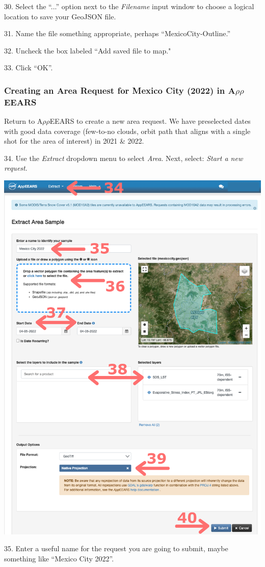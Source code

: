 \documentclass[oneside,a4paper,11pt,explicit]{book}
\begin{document}
30. Select the ``...'' option next to the \textit{Filename} input window to choose a logical location to save your GeoJSON file.

31. Name the file something appropriate, perhaps ``MexicoCity-Outline.'' 

32. Uncheck the box labeled ``Add saved file to map." 

33. Click ``OK''.

\subsubsection{Creating an Area Request for Mexico City (2022) in A$\rho\rho$EEARS}

Return to A$\rho\rho$EEARS to create a new area request. We have preselected dates with good data coverage (few-to-no clouds, orbit path that aligns with a single shot for the area of interest) in 2021 \& 2022. 

34. Use the \textit{Extract} dropdown menu to select \textit{Area}. Next, select: \textit{Start a new request}. 

\vspace{.5em}

\centerline{\includegraphics[width=.6\textwidth]{ESIareaRequest.png}}

\vspace{.5em}

35. Enter a useful name for the request you are going to submit, maybe something like ``Mexico City 2022''. 
\end{document}
